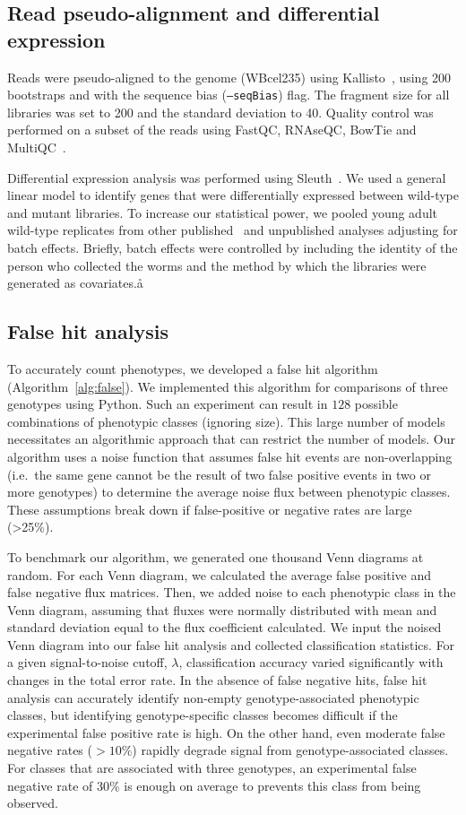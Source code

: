 \subsection*{Read pseudo-alignment and differential expression}
Reads were pseudo-aligned to the \cel{} genome (WBcel235) using
Kallisto~\citep{Bray2016}, using 200 bootstraps and with the sequence bias
(\texttt{--seqBias}) flag. The fragment size for all libraries was set to 200
and the standard deviation to 40. Quality control was performed on a subset of
the reads using FastQC, RNAseQC, BowTie and MultiQC~\citep{Andrews2010,
Deluca2012, Langmead2009, Ewels2016}.

Differential expression analysis was performed using
Sleuth~\citep{Pimentel2016a}. We used a general linear model to identify genes
that were differentially expressed between wild-type and mutant libraries. To
increase our statistical power, we pooled young adult wild-type replicates from
other published~\citep{AngelesAlboresHIF, Angeles-Albores2017} and unpublished
analyses adjusting for batch effects. Briefly, batch effects were controlled by
including the identity of the person who collected the worms and the method
by which the libraries were generated as covariates.å

\subsection*{False hit analysis}
To accurately count phenotypes, we developed a false hit algorithm
(Algorithm~\ref{alg:false}). We implemented this algorithm for comparisons of
three genotypes using Python. Such an experiment can result in $128$ possible
combinations of phenotypic classes (ignoring size). This large number
of models necessitates an algorithmic approach that can restrict the
number of models. Our algorithm uses a noise function that assumes
false hit events are non-overlapping (i.e.\ the same gene cannot be the result
of two false positive events in two or more genotypes) to determine the average
noise flux between phenotypic classes. These assumptions break down if
false-positive or negative rates are large (>25\%).

To benchmark our algorithm, we generated one thousand Venn diagrams at random.
For each Venn diagram, we calculated the average false positive and false
negative flux matrices. Then, we added noise to each phenotypic class in the
Venn diagram, assuming that fluxes were normally distributed with mean and
standard deviation equal to the flux coefficient calculated. We input the noised
Venn diagram into our false hit analysis and collected classification
statistics. For a given signal-to-noise cutoff, $\lambda$, classification
accuracy varied significantly with changes in the total error rate. In the
absence of false negative hits, false hit analysis can accurately identify
non-empty genotype-associated phenotypic classes, but identifying
genotype-specific classes becomes difficult if the experimental false positive
rate is high. On the other hand, even moderate false negative rates ($>10\%$)
rapidly degrade signal from genotype-associated classes. For classes that are
associated with three genotypes, an experimental false negative rate of 30\% is
enough on average to prevents this class from being observed.

